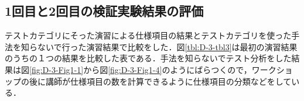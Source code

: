\documentclass[a4paper,12pt]{jreport}
\begin{document}
\subsection{1回目と2回目の検証実験結果の評価}
テストカテゴリにそった演習による仕様項目の結果とテストカテゴリを使った手法を知らないで行った演習結果で比較をした．図\ref{tbl:D-3-tbl3}は最初の演習結果のうちの１つの結果を比較した表である．手法を知らないでテスト分析をした結果は図\ref{fig:D-3-Fig1-1}から図\ref{fig:D-3-Fig1-4}のようにばらつくので，ワークショップの後に講師が仕様項目の数を計算できるように仕様項目の分類などをしている．
\end{document}
